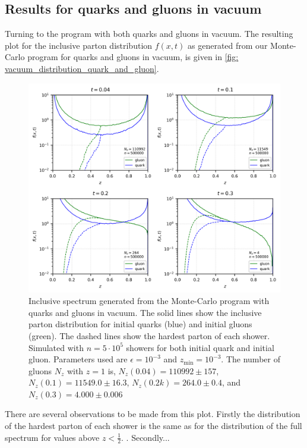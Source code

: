 \documentclass[main.tex]{subfiles}
\begin{document}
\subsection{Results for quarks and gluons in vacuum}
Turning to the program with both quarks and gluons in vacuum. The resulting plot for the inclusive parton distribution \(f(x,t)\) as generated from our Monte-Carlo program for quarks and gluons in vacuum, is given in \autoref{fig: vacuum_distribution_quark_and_gluon}.
\begin{figure}[htb]
    \centering
    \includegraphics[width=12cm]{pictures/plots/distributions/vacuum/dasgupta_quarksgluons_N500000.png}
    \caption{Inclusive spectrum generated from the Monte-Carlo program with quarks and gluons in vacuum. The solid lines show the inclusive parton distribution for initial quarks (blue) and initial gluons (green). The dashed lines show the hardest parton of each shower. Simulated with \(n=5\cdot 10^5\) showers for both initial quark and initial gluon. Parameters used are \(\epsilon=10^{-3}\) and \(z_{\text{min}}=10^{-3}\). The number of gluons \(N_z\) with \(z=1\) is, \(N_z(0.04)=110992 \pm 157\), \(N_z(0.1)=11549.0 \pm 16.3\), \(N_z(0.2k)=264.0 \pm 0.4\), and \(N_z(0.3)=4.000 \pm 0.006\)}
    \label{fig: vacuum_distribution_quark_and_gluon}
\end{figure}

There are several observations to be made from this plot. Firstly the distribution of the hardest parton of each shower is the same as for the distribution of the full spectrum for values above \(z<\frac{1}{2}\). . 
Secondly...
\end{document}
